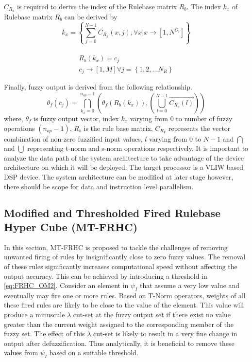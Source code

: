 $ C_{{R_k}} $ is required to derive the index of the Rulebase matrix $ R_b $.  The index $ k_x $ of Rulebase matrix $ R_b $ can be derived by
\begin{equation}
{k_x} = \left\{ {\sum\limits_{j = 0}^{N - 1} {{C_{{R_k}}}\left( {x,j} \right),\forall x|x \to \left[ {1,{N^{{O_l}}}} \right]} } \right\}
\end{equation}
\\
\begin{equation} \label{eq:Rb_kx}
\begin{array}{l}
{R_b}\left( {{k_x}} \right) = {c_j}\\
{c_j} \to \left[ {1,M} \right]\forall j = \left\{ {1,2, \ldots {N_R}} \right\}
\end{array}
\end{equation}
\par
Finally, fuzzy output is derived from the following relationship. 
\begin{equation} \label{eq:MFRHC-final}
{\theta _f}({c_j}) = \bigcap\limits_{{k_x} = 0}^{n_{op} - 1} {\left( {{\theta _f}\left( {{R_b}\left( {{k_x}} \right)} \right),\left( {\bigcup\limits_{l = 0}^{N - 1} {\overrightarrow {{C_{{R_v}}}\left( l \right)} } } \right)} \right)} 
\end{equation}
where, $ {\theta _f} $ is  fuzzy output vector, index $ k_x $ varying from $ 0  $ to number of fuzzy operations $ (n_{op} - 1) $, $ R_b $ is the rule base matrix, $ C_{R_V} $ represents the vector combination of non-zero fuzzified input values, $ l $ varying from $ 0 $ to $ N-1 $ and $ \bigcap {} $  and $ \bigcup {} $ representing t-norm and s-norm operations respectively. It is important to analyze the data path of the system architecture to take advantage of the device architecture on which it will be deployed. The target processor is a VLIW based DSP device. The system architecture can be modified at later stage however, there should be scope for data and instruction level parallelism. 

\subsection{Modified and Thresholded Fired Rulebase Hyper Cube (MT-FRHC)}
In this section, MT-FRHC is proposed to tackle the challenges of removing unwanted firing of rules by insignificantly close to zero fuzzy values. The removal of these rules significantly increases computational speed without affecting the output accuracy. This can be achieved by introducing a threshold in \eqref{eq:FRHC_OM2}. Consider an element in $ {\psi _I} $ that assume a very low value and eventually may fire one or more rules. Based on T-Norm operators, weights of all these fired rules are likely to be close to the value of the element. This value will produce a minuscule $ \lambda $ cut-set at the fuzzy output set if there exist no value greater than the current weight assigned to the corresponding member of the fuzzy set. The effect of this $ \lambda $ cut-set is likely to result in a very fine change in output after defuzzification. Thus analytically, it is beneficial to remove these values from  $ {\psi _I} $ based on a suitable threshold.  


